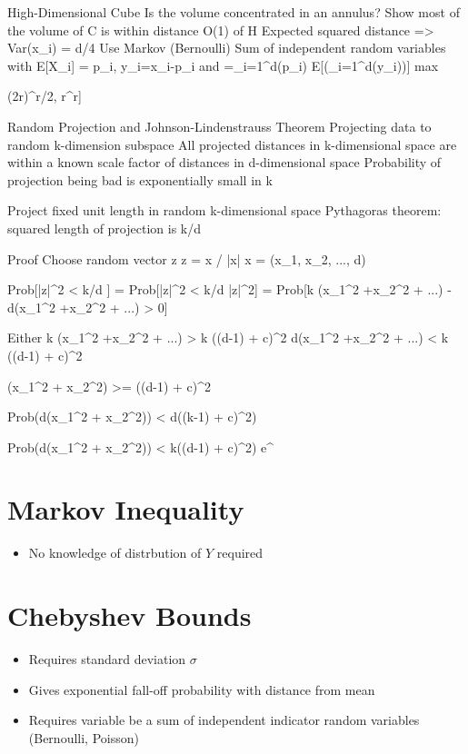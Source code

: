 High-Dimensional Cube
	Is the volume concentrated in an annulus?
		Show most of the volume of C is within distance O(1) of H
			Expected squared distance => Var(x_i) = d/4
			Use Markov (Bernoulli)
		Sum of independent random variables with E[X_i] = p_i, y_i=x_i-p_i and \mu=\sum_i=1^d(p_i)
			E[(\sum_i=1^d(y_i))] \le max{(2r\mu)^{r/2}, r^r]



Random Projection and Johnson-Lindenstrauss Theorem
	Projecting data to random k-dimension subspace
	All projected distances in k-dimensional space are within a known scale factor of distances in d-dimensional space
	Probability of projection being bad is exponentially small in k

	Project fixed unit length in random k-dimensional space
		Pythagoras theorem: squared length of projection is k/d

	Proof
		Choose random vector z
		z = x / |x|
			x = (x_1, x_2, ..., d)

		Prob[|z|^2 < \beta k/d ] = Prob[|z|^2 < \beta k/d |z|^2]
			= Prob[\beta k (x_1^2 +x_2^2 + ...) - d(x_1^2 +x_2^2 + ...) > 0]

		Either
			\beta k (x_1^2 +x_2^2 + ...) > \beta k (\sqrt(d-1) + c)^2
			d(x_1^2 +x_2^2 + ...) < \beta k (\sqrt(d-1) + c)^2


		(x_1^2 + x_2^2) >= (\sqrt(d-1) + c)^2

		Prob(d(x_1^2 + x_2^2)) < d(\sqrt(k-1) + c)^2)

		Prob(d(x_1^2 + x_2^2)) < \beta k(\sqrt(d-1) + c)^2) \le e^{}






\section{Markov Inequality}
\begin{itemize}
	\item No knowledge of distrbution of $Y$ required
\end{itemize}

\section{Chebyshev Bounds}
\begin{itemize}
	\item Requires standard deviation $\sigma$
	\item Gives exponential fall-off probability with distance from mean
	\item Requires variable be a sum of independent indicator random variables (Bernoulli, Poisson)
\end{itemize}

}
